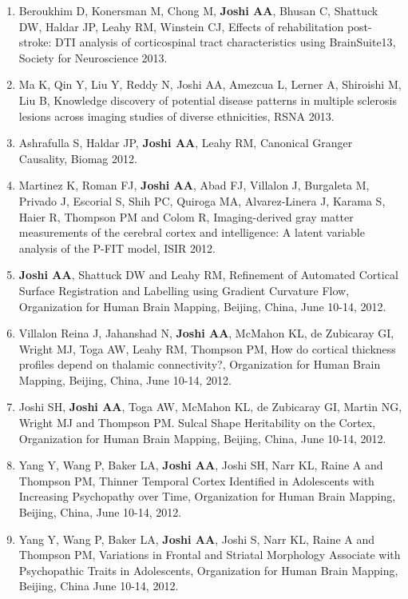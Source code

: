 \documentclass[overlapped,line,letterpaper]{res}
\begin{document}
\begin{resume}
\begin{enumerate}
    \item Beroukhim D, Konersman M, Chong M, \textbf{Joshi AA}, Bhusan C, Shattuck DW, Haldar JP, Leahy RM, Winstein CJ, {Effects of rehabilitation post-stroke: DTI analysis of corticospinal tract characteristics using BrainSuite13}, Society for Neuroscience 2013.

    \item Ma K, Qin Y, Liu Y, Reddy N, {Joshi AA}, Amezcua L, Lerner A, Shiroishi M, Liu B, {Knowledge discovery of potential disease patterns in multiple sclerosis lesions across imaging studies of diverse ethnicities}, RSNA 2013.

    \item Ashrafulla S, Haldar JP, \textbf{Joshi AA}, Leahy RM, {Canonical Granger Causality}, Biomag 2012.

    \item Martinez K, Roman FJ, \textbf{Joshi AA}, Abad FJ, Villalon J, Burgaleta M, Privado J, Escorial S, Shih PC, Quiroga MA, Alvarez-Linera J, Karama S, Haier R, Thompson PM and Colom R, {Imaging-derived gray matter measurements of the cerebral cortex and intelligence: A latent variable analysis of the P-FIT model}, ISIR 2012.

    \item \textbf{Joshi AA}, Shattuck DW and Leahy RM, {Refinement of Automated Cortical Surface Registration and Labelling using Gradient Curvature Flow}, Organization for Human Brain Mapping, Beijing, China, June 10-14, 2012.

    \item Villalon Reina J, Jahanshad N, \textbf{Joshi AA}, McMahon KL, de Zubicaray GI, Wright MJ, Toga AW, Leahy RM, Thompson PM, {How do cortical thickness profiles depend on thalamic connectivity?}, Organization for Human Brain Mapping, Beijing, China, June 10-14, 2012.

    \item Joshi SH, \textbf{Joshi AA}, Toga AW, McMahon KL, de Zubicaray GI, Martin NG, Wright MJ and Thompson PM. {Sulcal Shape Heritability on the Cortex}, Organization for Human Brain Mapping, Beijing, China, June 10-14, 2012.

    \item Yang Y, Wang P, Baker LA, \textbf{Joshi AA}, Joshi SH, Narr KL, Raine A and Thompson PM, {Thinner Temporal Cortex Identified in Adolescents with Increasing Psychopathy over Time}, Organization for Human Brain Mapping, Beijing, China, June 10-14, 2012.

    \item Yang Y, Wang P, Baker LA, \textbf{Joshi AA}, Joshi S, Narr KL, Raine A and Thompson PM, {Variations in Frontal and Striatal Morphology Associate with Psychopathic Traits in Adolescents}, Organization for Human Brain Mapping, Beijing, China June 10-14, 2012.


\end{enumerate}
\end{resume}
\end{document}

